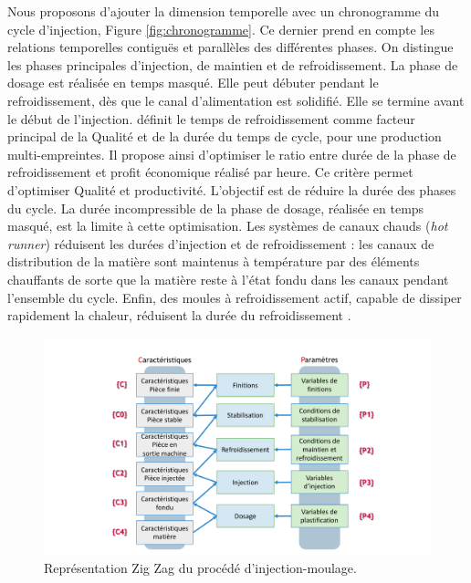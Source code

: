 Nous proposons d’ajouter la dimension temporelle avec un chronogramme du cycle d’injection, Figure \ref{fig:chronogramme}.
Ce dernier prend en compte les relations temporelles contiguës et parallèles des différentes phases.
On distingue les phases principales d’injection, de maintien et de refroidissement.
La phase de dosage est réalisée en temps masqué.
Elle peut débuter pendant le refroidissement, dès que le canal d’alimentation est solidifié.
Elle se termine avant le début de l'injection.
\cite{thyregod_modelling_2001} définit le temps de refroidissement comme facteur principal de la Qualité et de la durée du temps de cycle, pour une production multi-empreintes.
Il propose ainsi d'optimiser le ratio entre durée de la phase de refroidissement et profit économique réalisé par heure.
Ce critère permet d'optimiser Qualité et productivité.
L’objectif est de réduire la durée des phases du cycle.
La durée incompressible de la phase de dosage, réalisée en temps masqué, est la limite à cette optimisation.
Les systèmes de canaux chauds (\textit{hot runner}) réduisent les durées d’injection et de refroidissement : les canaux de distribution de la matière sont maintenus à température par des éléments chauffants de sorte que la matière reste à l’état fondu dans les canaux pendant l’ensemble du cycle.
Enfin, des moules à refroidissement actif, capable de dissiper rapidement la chaleur, réduisent la durée du refroidissement \cite{kazmer_towards_1999}.

\begin{figure}[hbtp]
	\centering
	\includegraphics[width=\textwidth,height=\textheight,keepaspectratio]{../Chap1/Figures/Sapristi_ZigZag.pdf}
	\caption{Représentation Zig Zag du procédé d'injection-moulage.}
	\label{fig:zigzag}
\end{figure}

